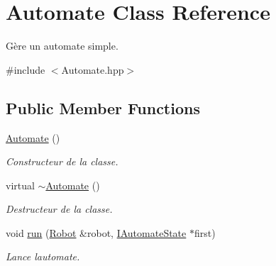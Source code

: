 \hypertarget{classAutomate}{}\section{Automate Class Reference}
\label{classAutomate}


Gère un automate simple.  




{\ttfamily \#include $<$Automate.\+hpp$>$}

\subsection*{Public Member Functions}
\begin{DoxyCompactItemize}
\item 
\mbox{\label{classAutomate_a79dcc6fd193e40ab8246b4a70b904a11}} 
\hyperlink{classAutomate_a79dcc6fd193e40ab8246b4a70b904a11}{Automate} ()
\begin{DoxyCompactList}\small\item\em Constructeur de la classe. \end{DoxyCompactList}\item 
\mbox{\label{classAutomate_acbe795cff71547d3c32a0cd5c0f6f2ac}} 
virtual \hyperlink{classAutomate_acbe795cff71547d3c32a0cd5c0f6f2ac}{$\sim$\+Automate} ()
\begin{DoxyCompactList}\small\item\em Destructeur de la classe. \end{DoxyCompactList}\item 
void \hyperlink{classAutomate_a1df5d3b6c5abc353b347f4defcfde4e9}{run} (\hyperlink{classRobot}{Robot} \&robot, \hyperlink{classIAutomateState}{I\+Automate\+State} $\ast$first)
\begin{DoxyCompactList}\small\item\em Lance l\textquotesingle{}automate. \end{DoxyCompactList}\end{DoxyCompactItemize}
